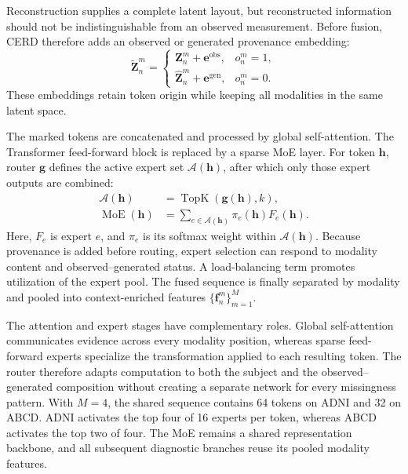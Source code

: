 \documentclass[a4paper,fleqn]{cas-dc}
\begin{document}
Reconstruction supplies a complete latent layout, but reconstructed information should not be indistinguishable from an observed measurement. Before fusion, CERD therefore adds an observed or generated provenance embedding:
\begin{equation}
\widetilde{\mathbf Z}_n^m=
\begin{cases}
\mathbf Z_n^m+\mathbf e^{\mathrm{obs}}, & o_n^m=1,\\
\widehat{\mathbf Z}_n^m+\mathbf e^{\mathrm{gen}}, & o_n^m=0.
\end{cases}
\label{eq:source_embedding}
\end{equation}
These embeddings retain token origin while keeping all modalities in the same latent space.

The marked tokens are concatenated and processed by global self-attention. The Transformer feed-forward block is replaced by a sparse MoE layer. For token \(\mathbf h\), router \(\mathbf g\) defines the active expert set \(\mathcal A(\mathbf h)\), after which only those expert outputs are combined:
\begin{equation}
\begin{aligned}
\mathcal A(\mathbf h)&=\operatorname{TopK}(\mathbf g(\mathbf h),k),\\
\operatorname{MoE}(\mathbf h)
  &=\sum_{e\in\mathcal A(\mathbf h)}
    \pi_e(\mathbf h)F_e(\mathbf h).
\end{aligned}
\label{eq:sparse_moe}
\end{equation}
Here, \(F_e\) is expert \(e\), and \(\pi_e\) is its softmax weight within \(\mathcal A(\mathbf h)\). Because provenance is added before routing, expert selection can respond to modality content and observed--generated status. A load-balancing term promotes utilization of the expert pool. The fused sequence is finally separated by modality and pooled into context-enriched features \(\{\mathbf f_n^m\}_{m=1}^{M}\).

The attention and expert stages have complementary roles. Global self-attention communicates evidence across every modality position, whereas sparse feed-forward experts specialize the transformation applied to each resulting token. The router therefore adapts computation to both the subject and the observed--generated composition without creating a separate network for every missingness pattern. With \(M=4\), the shared sequence contains 64 tokens on ADNI and 32 on ABCD. ADNI activates the top four of 16 experts per token, whereas ABCD activates the top two of four. The MoE remains a shared representation backbone, and all subsequent diagnostic branches reuse its pooled modality features.
\end{document}

